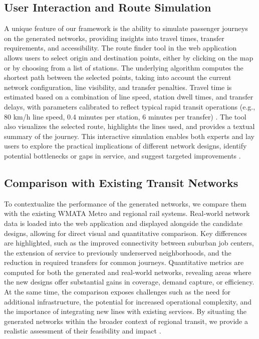 \documentclass[manuscript]{acmart}
\begin{document}
\subsection{User Interaction and Route Simulation}
A unique feature of our framework is the ability to simulate passenger journeys on the generated networks, providing insights into travel times, transfer requirements, and accessibility. The route finder tool in the web application allows users to select origin and destination points, either by clicking on the map or by choosing from a list of stations. The underlying algorithm computes the shortest path between the selected points, taking into account the current network configuration, line visibility, and transfer penalties. Travel time is estimated based on a combination of line speed, station dwell times, and transfer delays, with parameters calibrated to reflect typical rapid transit operations (e.g., 80 km/h line speed, 0.4 minutes per station, 6 minutes per transfer) \cite{bib:wmata-vmt}. The tool also visualizes the selected route, highlights the lines used, and provides a textual summary of the journey. This interactive simulation enables both experts and lay users to explore the practical implications of different network designs, identify potential bottlenecks or gaps in service, and suggest targeted improvements \cite{bib:bast2016route}.

\subsection{Comparison with Existing Transit Networks}
To contextualize the performance of the generated networks, we compare them with the existing WMATA Metro and regional rail systems. Real-world network data is loaded into the web application and displayed alongside the candidate designs, allowing for direct visual and quantitative comparison. Key differences are highlighted, such as the improved connectivity between suburban job centers, the extension of service to previously underserved neighborhoods, and the reduction in required transfers for common journeys. Quantitative metrics are computed for both the generated and real-world networks, revealing areas where the new designs offer substantial gains in coverage, demand capture, or efficiency. At the same time, the comparison exposes challenges such as the need for additional infrastructure, the potential for increased operational complexity, and the importance of integrating new lines with existing services. By situating the generated networks within the broader context of regional transit, we provide a realistic assessment of their feasibility and impact \cite{bib:overview-field, bib:bast2016route}.
\end{document}
